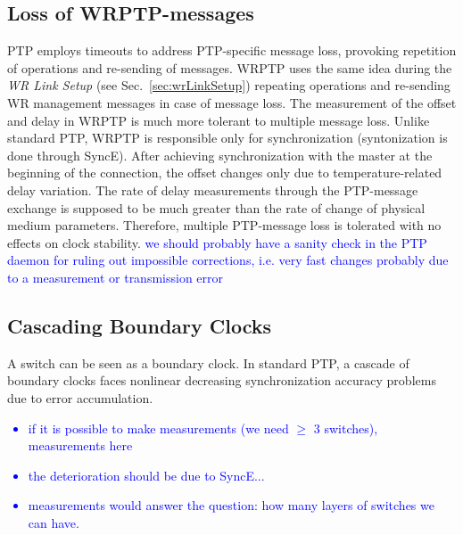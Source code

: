 \subsection{Loss of WRPTP-messages}

PTP employs timeouts to address PTP-specific message loss, provoking
repetition of operations and re-sending of messages. WRPTP uses the
same idea during the \textit{WR Link Setup} (see
Sec.~\ref{sec:wrLinkSetup}) repeating operations and re-sending WR
management messages in case of message loss. The measurement of the
offset and delay in WRPTP is much more tolerant to multiple message
loss. Unlike standard PTP, WRPTP is responsible only for
synchronization (syntonization is done through SyncE). After achieving
synchronization with the master at the beginning of the connection,
the offset changes only due to temperature-related delay
variation. The rate of delay measurements through the PTP-message
exchange is supposed to be much greater than the rate of change of
physical medium parameters. Therefore, multiple PTP-message loss is
tolerated with no effects on clock stability.  \textcolor{blue}{we
  should probably have a sanity check in the PTP daemon for ruling out
  impossible corrections, i.e. very fast changes probably due to a
  measurement or transmission error}

\subsection{Cascading Boundary Clocks}

A switch can be seen as a boundary clock. In standard PTP, a cascade
of boundary clocks faces nonlinear decreasing synchronization accuracy
problems due to error accumulation.  \textcolor{blue}{
  \begin{itemize}
  \item if it is possible to make measurements (we need $\geq$ 3
    switches), measurements here
  \item the deterioration should be due to SyncE...
  \item measurements would answer the question: how many layers of
    switches we can have.
\end{itemize}
}